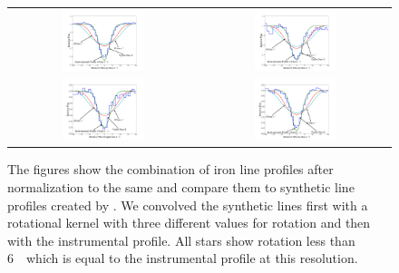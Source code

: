 \begin{figure}[h!]
\begin{tabular}{cc}
\includegraphics[width=0.45\textwidth, trim=130 30 60 0]{chapter_sn1572_hires/plots/stara_rotation.pdf} &
\includegraphics[width=0.45\textwidth, trim=130 30 60 0]{chapter_sn1572_hires/plots/starc_rotation.pdf} \\
\includegraphics[width=0.45\textwidth, trim=130 30 60 0]{chapter_sn1572_hires/plots/stare_rotation.pdf} &
\includegraphics[width=0.45\textwidth, trim=130 30 60 0]{chapter_sn1572_hires/plots/starg_rotation.pdf} \\
\end{tabular}
\caption[Rotation measurement for all candidate stars in SN 1572]{The figures show the combination of iron line profiles after normalization to the same  and compare them to synthetic line profiles created by . We convolved the synthetic lines first with a rotational kernel with three different values for rotation and then with the instrumental profile. All stars show rotation less than 6~\kms\ which is equal to the instrumental profile at this resolution. }
\label{fig:sn1572_hires:rotvel}
\end{figure}

